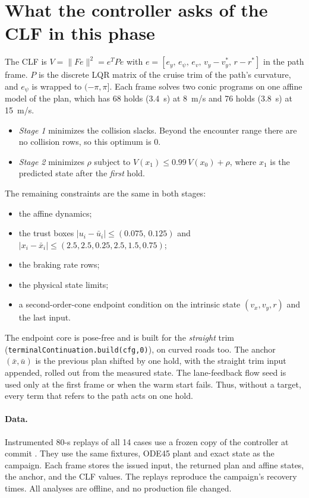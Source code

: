 \documentclass[11pt]{article}
\begin{document}
\section{What the controller asks of the CLF in this phase}
The CLF is $V=\|Fe\|^2=e^TPe$ with
$e=[e_y,\,e_\psi,\,e_v,\,v_y-v_y^*,\,r-r^*]$ in the path frame. $P$ is the
discrete LQR matrix of the cruise trim of the path's curvature, and $e_\psi$ is
wrapped to $(-\pi,\pi]$. Each frame solves two conic programs on one affine
model of the plan, which has 68 holds (3.4~s) at 8~m/s and 76 holds (3.8~s) at
15~m/s.
\begin{itemize}
\item \emph{Stage 1} minimizes the collision slacks. Beyond the encounter range
there are no collision rows, so this optimum is 0.
\item \emph{Stage 2} minimizes $\rho$ subject to
$V(x_1)\le0.99\,V(x_0)+\rho$, where $x_1$ is the predicted state after the
\emph{first} hold.
\end{itemize}
The remaining constraints are the same in both stages:
\begin{itemize}
\item the affine dynamics;
\item the trust boxes $|u_i-\bar u_i|\le(0.075,\,0.125)$ and
$|x_i-\bar x_i|\le(2.5,2.5,0.25,2.5,1.5,0.75)$;
\item the braking rate rows;
\item the physical state limits;
\item a second-order-cone endpoint condition on the intrinsic state
$(v_x,v_y,r)$ and the last input.
\end{itemize}
The endpoint core is pose-free and is built for the \emph{straight} trim
(\texttt{terminalContinuation.build(cfg,0)}), on curved roads too. The anchor
$(\bar x,\bar u)$ is the previous plan shifted by one hold, with the straight
trim input appended, rolled out from the measured state. The lane-feedback flow
seed is used only at the first frame or when the warm start fails. Thus, without a target,
every term that refers to the path acts on one hold.

\paragraph{Data.} Instrumented 80-s replays of all 14 cases use a frozen copy of
the controller at commit . They use the same fixtures, ODE45 plant
and exact state as the campaign. Each frame stores the issued input, the
returned plan and affine states, the anchor, and the CLF values. The replays
reproduce the campaign's recovery times. All analyses are offline, and no
production file changed.
\end{document}
